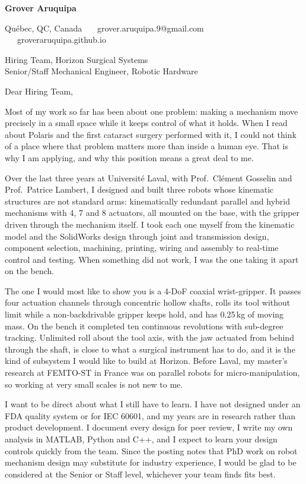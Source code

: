 \documentclass[11pt,letterpaper]{article}
\begin{document}
{\large\bfseries Grover Aruquipa}\par\vspace{-6pt}
{\small Qu\'ebec, QC, Canada \ \textbullet\ \ grover.aruquipa.9@gmail.com \ \textbullet\ \ groveraruquipa.github.io}

\vspace{6pt}
Hiring Team, Horizon Surgical Systems\\
Senior/Staff Mechanical Engineer, Robotic Hardware

Dear Hiring Team,

Most of my work so far has been about one problem: making a mechanism move precisely in a small space while it keeps control of what it holds. When I read about Polaris and the first cataract surgery performed with it, I could not think of a place where that problem matters more than inside a human eye. That is why I am applying, and why this position means a great deal to me.

Over the last three years at Universit\'e Laval, with Prof.\ Cl\'ement Gosselin and Prof.\ Patrice Lambert, I designed and built three robots whose kinematic structures are not standard arms: kinematically redundant parallel and hybrid mechanisms with 4, 7 and 8 actuators, all mounted on the base, with the gripper driven through the mechanism itself. I took each one myself from the kinematic model and the SolidWorks design through joint and transmission design, component selection, machining, printing, wiring and assembly to real-time control and testing. When something did not work, I was the one taking it apart on the bench.

The one I would most like to show you is a 4-DoF coaxial wrist-gripper. It passes four actuation channels through concentric hollow shafts, rolls its tool without limit while a non-backdrivable gripper keeps hold, and has 0.25\,kg of moving mass. On the bench it completed ten continuous revolutions with sub-degree tracking. Unlimited roll about the tool axis, with the jaw actuated from behind through the shaft, is close to what a surgical instrument has to do, and it is the kind of subsystem I would like to build at Horizon. Before Laval, my master's research at FEMTO-ST in France was on parallel robots for micro-manipulation, so working at very small scales is not new to me.

I want to be direct about what I still have to learn. I have not designed under an FDA quality system or for IEC 60601, and my years are in research rather than product development. I document every design for peer review, I write my own analysis in MATLAB, Python and C++, and I expect to learn your design controls quickly from the team. Since the posting notes that PhD work on robot mechanism design may substitute for industry experience, I would be glad to be considered at the Senior or Staff level, whichever your team finds fits best.
\end{document}
